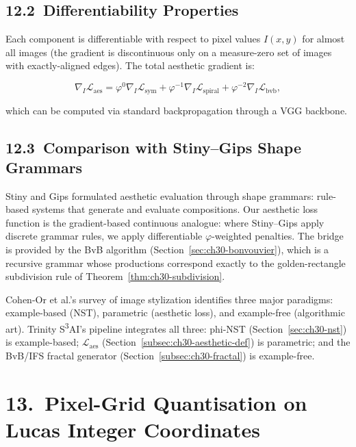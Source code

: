 \subsection{12.2\ Differentiability
  Properties}\label{subsec:ch30-diff}

Each component is differentiable with respect to
pixel values $I(x,y)$ for almost all images
(the gradient is discontinuous only on a
measure-zero set of images with exactly-aligned
edges).  The total aesthetic gradient is:

\[\nabla_I \mathcal{L}_{\text{aes}}
  = \varphi^0 \nabla_I \mathcal{L}_{\text{sym}}
  + \varphi^{-1} \nabla_I \mathcal{L}_{\text{spiral}}
  + \varphi^{-2} \nabla_I \mathcal{L}_{\text{bvb}},\]

which can be computed via standard
backpropagation through a VGG backbone.

\subsection{12.3\ Comparison with
  Stiny--Gips Shape Grammars}\label{subsec:ch30-shape-grammar}

Stiny and Gips \cite{stiny_algorithmic_aesthetics}
formulated aesthetic evaluation through
shape grammars: rule-based systems that generate
and evaluate compositions.  Our aesthetic loss
function is the gradient-based continuous
analogue: where Stiny--Gips apply discrete
grammar rules, we apply differentiable
$\varphi$-weighted penalties.  The bridge is
provided by the BvB algorithm
(Section~\ref{sec:ch30-bonvouvier}), which is
a recursive grammar whose productions correspond
exactly to the golden-rectangle subdivision rule
of Theorem~\ref{thm:ch30-subdivision}.

Cohen-Or et al.'s survey of image stylization
\cite{cohenor_stylization} identifies three major
paradigms: example-based (NST), parametric
(aesthetic loss), and example-free (algorithmic
art).  Trinity S\textsuperscript{3}AI's pipeline
integrates all three: phi-NST
(Section~\ref{sec:ch30-nst}) is example-based;
$\mathcal{L}_{\text{aes}}$
(Section~\ref{subsec:ch30-aesthetic-def}) is
parametric; and the BvB/IFS fractal generator
(Section~\ref{subsec:ch30-fractal}) is
example-free.

\section{13.\ Pixel-Grid Quantisation on Lucas
  Integer Coordinates}\label{sec:ch30-lucas-coords}


